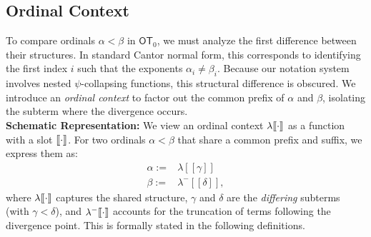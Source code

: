 \documentclass{amsart}
\theoremstyle{plain}
\theoremstyle{plain}
\def\scbrl{[\hspace{-.14em}[}
\def\scbrr{]\hspace{-.14em}]}
\def\scbr#1{\scbrl#1\scbrr}
\newcommand\OT{\mathsf{OT}}
\def\scbrl{[\hspace{-.14em}[}
\def\scbrr{]\hspace{-.14em}]}
\def\scbr#1{\scbrl#1\scbrr}
\begin{document}
\subsection{Ordinal Context }
To compare ordinals $\alpha < \beta$ in $\OT_0$, we must analyze the first difference between their structures. In standard Cantor normal form, this corresponds to identifying the first index $i$ such that the exponents $\alpha_i \neq \beta_i$. Because our notation system involves nested $\psi$-collapsing functions, this structural difference is obscured. We introduce an \emph{ordinal context} to factor out the common prefix of $\alpha$ and $\beta$, isolating the subterm where the divergence occurs.\medskip
\\
\noindent \textbf{Schematic Representation:}
We view an ordinal context $\lambda\scbr{\cdot}$ as a function with a slot $\scbr{\cdot}$. For two ordinals $\alpha < \beta$ that share a common prefix and suffix, we express them as:
\[
\begin{array}{cc}
\alpha := & \lambda[[\gamma]] \\
\beta  := & \lambda^- [[\delta]],
\end{array}
\]
where $\lambda\scbr{\cdot}$ captures the shared structure, $\gamma$ and $\delta$ are the {\em differing} subterms (with $\gamma < \delta$), 
and $\lambda^- \scbr{\cdot}$ accounts for the truncation of terms following the divergence point. This is formally stated in the following definitions.
\end{document}
